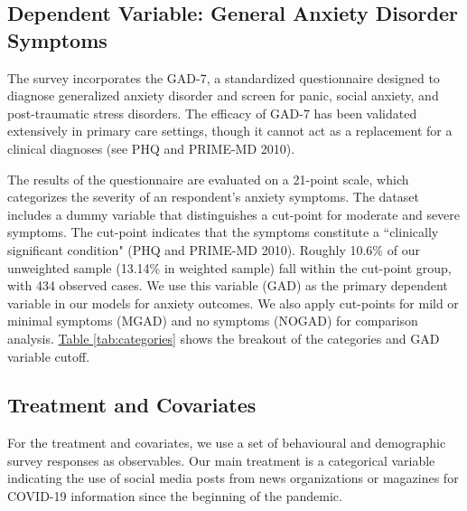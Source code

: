 \documentclass{article}[12pt]
\begin{document}
    \subsection{Dependent Variable: General Anxiety Disorder Symptoms}
        
        The survey incorporates the GAD-7, a standardized questionnaire designed to diagnose generalized anxiety disorder and screen for panic, social anxiety, and post-traumatic stress disorders. The efficacy of GAD-7 has been validated extensively in primary care settings, though it cannot act as a replacement for a clinical diagnoses (see PHQ and PRIME-MD 2010).

        The results of the questionnaire are evaluated on a 21-point scale, which categorizes the severity of an respondent's anxiety symptoms. The dataset includes a dummy variable that distinguishes a cut-point for moderate and severe symptoms. The cut-point indicates that the symptoms constitute a ``clinically significant condition" (PHQ and PRIME-MD 2010). Roughly 10.6\% of our unweighted sample (13.14\% in weighted sample) fall within the cut-point group, with 434 observed cases. We use this variable (GAD) as the primary dependent variable in our models for anxiety outcomes. We also apply cut-points for mild or minimal symptoms (MGAD) and no symptoms (NOGAD) for comparison analysis. \hyperref[tab:categories]{Table \ref*{tab:categories}} shows the breakout of the categories and GAD variable cutoff.
        
    \subsection{Treatment and Covariates}
        
        For the treatment and covariates, we use a set of behavioural and demographic survey responses as observables. Our main treatment is a categorical variable indicating the use of social media posts from news organizations or magazines for COVID-19 information since the beginning of the pandemic.
        
\end{document}
